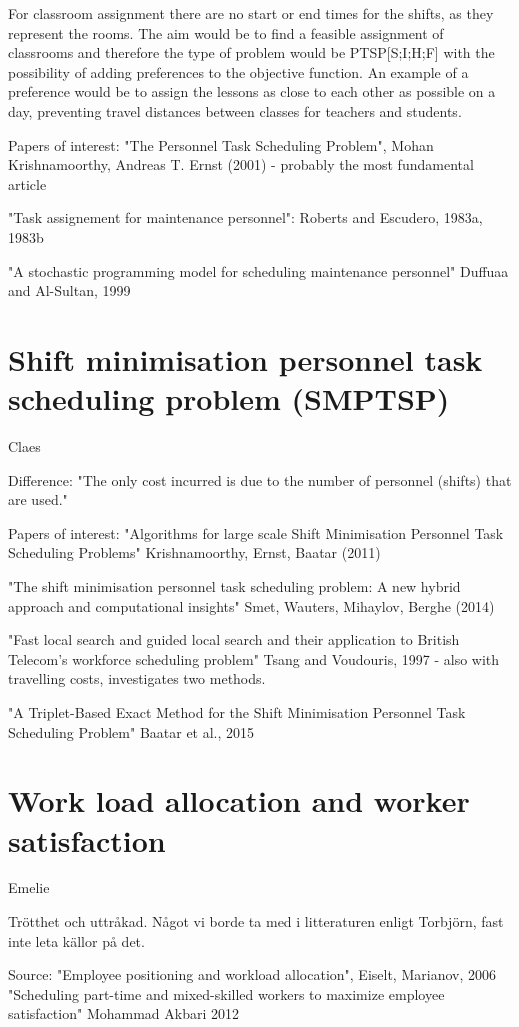 For classroom assignment there are no start or end times for the shifts, as they represent the rooms. The aim would be to find a feasible assignment of classrooms and therefore the type of problem would be PTSP[S;I;H;F] with the possibility of adding preferences to the objective function. An example of a preference would be to assign the lessons as close to each other as possible on a day, preventing travel distances between classes for teachers and students.


Papers of interest:
"The Personnel Task Scheduling Problem", Mohan Krishnamoorthy, Andreas T. Ernst (2001) - probably the most fundamental article

"Task assignement for maintenance personnel": Roberts and Escudero, 1983a, 1983b

"A stochastic programming model for scheduling maintenance personnel" Duffuaa and Al-Sultan, 1999

\section{Shift minimisation personnel task scheduling problem (SMPTSP)}\label{SMTSP}
Claes

Difference: "The only cost incurred is due to the number of personnel (shifts) that are used."

Papers of interest:
"Algorithms for large scale Shift Minimisation Personnel Task Scheduling Problems" Krishnamoorthy, Ernst, Baatar (2011)

"The shift minimisation personnel task scheduling problem: A new hybrid approach and computational insights" Smet, Wauters, Mihaylov, Berghe (2014)

"Fast local search and guided local search and their application to British Telecom's workforce scheduling problem" Tsang and Voudouris, 1997 - also with travelling costs, investigates two methods.

"A Triplet-Based Exact Method for the Shift Minimisation Personnel Task Scheduling Problem" Baatar et al., 2015

\section{Work load allocation and worker satisfaction} \label{WLA}
Emelie

Trötthet och uttråkad. Något vi borde ta med i litteraturen enligt Torbjörn, fast inte leta källor på det.

Source: "Employee positioning and workload allocation", Eiselt, Marianov, 2006
"Scheduling part-time and mixed-skilled workers to maximize employee satisfaction" Mohammad Akbari 2012

